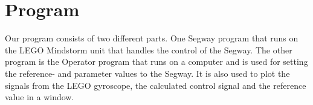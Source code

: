 


\section{Program}
Our program consists of two different parts. One Segway program that runs on the LEGO Mindstorm unit that handles the control of the Segway. The other program is the Operator program that runs on a computer and is used for setting the reference- and parameter values to the Segway. It is also used to plot the signals from the LEGO gyroscope, the calculated control signal and the reference value in a window. 


